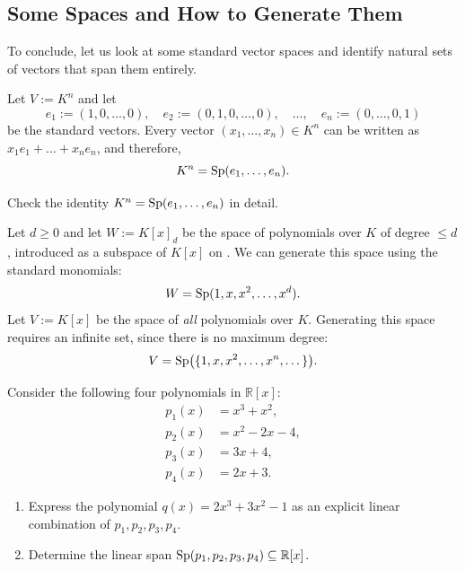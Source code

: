 \subsection{Some Spaces and How to Generate Them}

To conclude, let us look at some standard vector spaces and identify natural sets of  vectors that span them entirely.

\begin{example}
\label{ex:span_coordinate_space}
Let $V := K^n$ and let
\[
e_1 := (1, 0, \dots, 0), \quad e_2 := (0, 1, 0, \dots, 0), \quad \dots, \quad e_n := (0, \dots, 0, 1)
\]
be the standard vectors. Every vector $(x_1, \dots, x_n) \in K^n$ can be written as $x_1 e_1 + \dots + x_n e_n$, and therefore,
\[
K^n = \operatorname{Sp}(e_1, \dots, e_n).
\]
\end{example}

\begin{exercise}
\label{exc:check_standard_span}
Check the identity $K^n = \operatorname{Sp}(e_1, \dots, e_n)$ in detail.
\end{exercise}

\begin{example}[Polynomials]
\label{ex:span_polynomials}
Let $d \ge 0$ and let $W := K[x]_d$ be the space of polynomials over $K$ of degree $\le d$, introduced as a subspace of $K[x]$ on . We can generate this space using the standard monomials:
\[
W = \operatorname{Sp}(1, x, x^2, \dots, x^d).
\]
Let $V := K[x]$ be the space of \emph{all} polynomials over $K$. Generating this space requires an infinite set, since there is no maximum degree:
\[
V = \operatorname{Sp}\bigl(\{1, x, x^2, \dots, x^n, \dots\}\bigr).
\]
\end{example}

\begin{exercise}
\label{exc:polynomial_linear_combination_span}
Consider the following four polynomials in $\mathbb{R}[x]$:
\begin{align*}
p_1(x) &= x^3 + x^2, \\
p_2(x) &= x^2 - 2x - 4, \\
p_3(x) &= 3x + 4, \\
p_4(x) &= 2x + 3.
\end{align*}
\begin{enumerate}
    \item Express the polynomial $q(x) = 2x^3 + 3x^2 - 1$ as an explicit linear combination of $p_1, p_2, p_3, p_4$.
    \item Determine the linear span $\operatorname{Sp}(p_1, p_2, p_3, p_4) \subseteq \mathbb{R}[x]$.
\end{enumerate}
\end{exercise}

